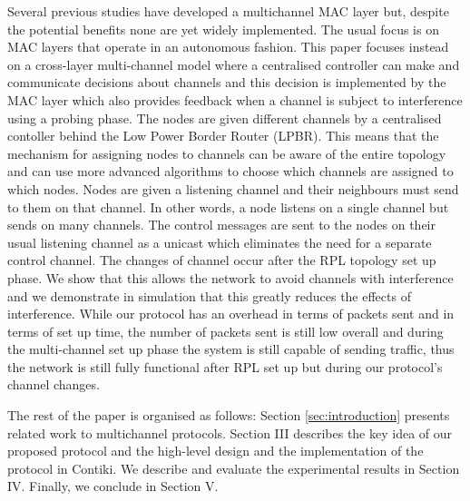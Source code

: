 Several previous studies have developed a multichannel MAC layer but, despite the potential benefits none are yet widely implemented.  The usual focus
is on MAC layers that operate in an autonomous fashion.  This paper focuses instead on a cross-layer multi-channel model where a centralised controller can make and communicate decisions about channels and this decision is implemented by the MAC layer which also provides feedback when a channel is subject to interference using a probing phase. The nodes are given different channels by a centralised contoller behind the Low Power Border Router (LPBR).  This means that the mechanism for assigning nodes to channels can be aware of the entire topology and can use more advanced algorithms to choose which channels are assigned to which nodes.  Nodes are given a listening channel and their neighbours must send to them on
that channel.  In other words, a node listens on a single channel but sends on many channels.
The control messages are sent to the nodes on their usual listening channel as a unicast which eliminates the need for a separate control channel.
The changes of channel occur after the RPL topology set up phase.  We show that this allows the network to avoid channels with interference and we
demonstrate in simulation that this greatly reduces the effects of interference.  While our protocol has an overhead in terms of packets sent and in terms of set up time, the number of packets sent is still low overall and during the multi-channel set up phase the system is still capable of
sending traffic, thus the network is still fully functional after RPL set up but during our protocol's channel changes.

The rest of the paper is organised as follows: Section \ref{sec:introduction} presents related work to multichannel protocols. Section III describes the key idea of our proposed protocol and the high-level design and the implementation of the protocol in Contiki. We describe and evaluate the experimental results in Section IV. Finally, we conclude in Section V.

%
